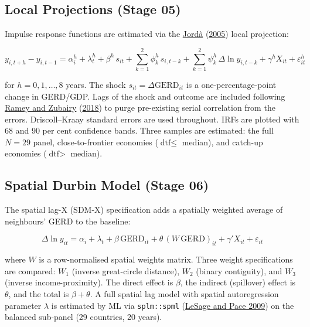 \documentclass[
  11pt,
]{article}
\begin{document}
\hypertarget{local-projections-stage-05}{%
\subsection{Local Projections (Stage 05)}\label{local-projections-stage-05}}

Impulse response functions are estimated via the \protect\hyperlink{ref-jorda2005}{Jordà} (\protect\hyperlink{ref-jorda2005}{2005}) local projection:

\[y_{i,t+h} - y_{i,t-1} = \alpha^h_i + \lambda^h_t + \beta^h\, s_{it} + \sum_{k=1}^{2}\phi^h_k\, s_{i,t-k} + \sum_{k=1}^{2}\psi^h_k\, \Delta\ln y_{i,t-k} + \gamma^h X_{it} + \varepsilon^h_{it}\]

for \(h = 0, 1, \ldots, 8\) years. The shock \(s_{it} = \Delta\text{GERD}_{it}\) is a one-percentage-point change in GERD/GDP. Lags of the shock and outcome are included following \protect\hyperlink{ref-ramey2018}{Ramey and Zubairy} (\protect\hyperlink{ref-ramey2018}{2018}) to purge pre-existing serial correlation from the errors. Driscoll--Kraay standard errors are used throughout. IRFs are plotted with 68 and 90 per cent confidence bands. Three samples are estimated: the full \(N = 29\) panel, close-to-frontier economies (\(\text{dtf} \leq\) median), and catch-up economies (\(\text{dtf} >\) median).

\hypertarget{spatial-durbin-model-stage-06}{%
\subsection{Spatial Durbin Model (Stage 06)}\label{spatial-durbin-model-stage-06}}

The spatial lag-X (SDM-X) specification adds a spatially weighted average of neighbours' GERD to the baseline:

\[\Delta\ln y_{it} = \alpha_i + \lambda_t + \beta\,\text{GERD}_{it} + \theta\,(W\,\text{GERD})_{it} + \gamma' X_{it} + \varepsilon_{it}\]

where \(W\) is a row-normalised spatial weights matrix. Three weight specifications are compared: \(W_1\) (inverse great-circle distance), \(W_2\) (binary contiguity), and \(W_3\) (inverse income-proximity). The direct effect is \(\beta\), the indirect (spillover) effect is \(\theta\), and the total is \(\beta + \theta\). A full spatial lag model with spatial autoregression parameter \(\lambda\) is estimated by ML via \texttt{splm::spml} (\protect\hyperlink{ref-lesagepace2009}{LeSage and Pace 2009}) on the balanced sub-panel (29 countries, 20 years).
\end{document}
